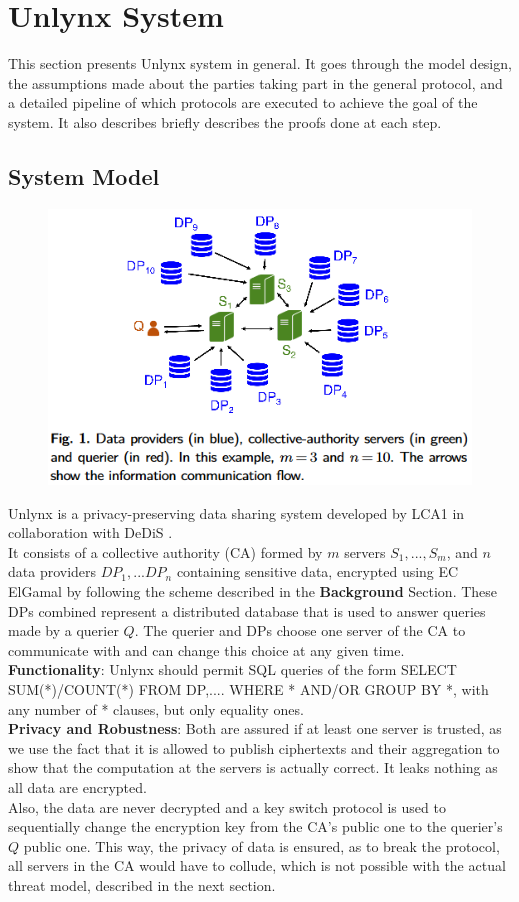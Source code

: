 \documentclass{article}
\begin{document}
\section{Unlynx System}
This section presents Unlynx \cite{unlynx} system in general. It goes through the model design, the assumptions made about the parties taking part in the general protocol, and a detailed pipeline of which protocols are executed to achieve the goal of the system. It also describes briefly describes the proofs done at each step.\\

\subsection{System Model}
\begin{figure}[H]
\centering
\includegraphics[scale=0.8]{img/UnlynxFunc.png}
\end{figure}
Unlynx is a privacy-preserving data sharing system developed by LCA1 \cite{lca} in collaboration with DeDiS \cite{dedis}.\\
It consists of a collective authority (CA) formed by $m$ servers $S_1,...,S_m$, and $n$ data providers $DP_1,...DP_n$ containing sensitive data, encrypted using EC ElGamal by following the scheme described in the \textbf{Background} Section. These DPs combined represent a distributed database that is used to answer queries made by a querier $Q$. The querier and DPs choose one server of the CA to communicate with and can change this choice at any given time.\\
\textbf{Functionality}: Unlynx should permit SQL queries of the form SELECT SUM(*)/COUNT(*) FROM DP,.... WHERE * AND/OR GROUP BY *, with any number of * clauses, but only equality ones.\\
\textbf{Privacy and Robustness}: Both are assured if at least one server is trusted, as we use the fact that it is allowed to publish ciphertexts and their aggregation to show that the computation at the servers is actually correct. It leaks nothing as all data are encrypted.\\
Also, the data are never decrypted and a key switch protocol is used to sequentially change the encryption key from the CA's public one to the querier's $Q$ public one. This way, the privacy of data is ensured, as to break the protocol, all servers in the CA would have to collude, which is not possible with the actual threat model, described in the next section.
\end{document}

